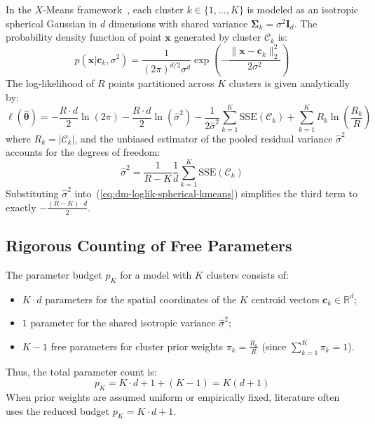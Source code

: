 In the $X$-Means framework~\cite{pelleg2000}, each cluster $k \in \{1, \dots, K\}$ is modeled as an isotropic spherical Gaussian in $d$ dimensions with shared variance $\boldsymbol{\Sigma}_k = \sigma^2 \mathbf{I}_d$. The probability density function of point $\mathbf{x}$ generated by cluster $\mathcal{C}_k$ is:
\begin{equation}
\label{eq:dm-spherical-gaussian-pdf}
p(\mathbf{x} | \mathbf{c}_k, \sigma^2) = \frac{1}{(2\pi)^{d/2} \sigma^d} \exp\left( -\frac{\|\mathbf{x} - \mathbf{c}_k\|_2^2}{2\sigma^2} \right)
\end{equation}
The log-likelihood of $R$ points partitioned across $K$ clusters is given analytically by:
\begin{equation}
\label{eq:dm-loglik-spherical-kmeans}
\ell(\hat{\boldsymbol{\theta}}) = -\frac{R \cdot d}{2} \ln(2\pi) - \frac{R \cdot d}{2} \ln(\hat{\sigma}^2) - \frac{1}{2\hat{\sigma}^2} \sum_{k=1}^K \mathrm{SSE}(\mathcal{C}_k) + \sum_{k=1}^K R_k \ln\left(\frac{R_k}{R}\right)
\end{equation}
where $R_k = |\mathcal{C}_k|$, and the unbiased estimator of the pooled residual variance $\hat{\sigma}^2$ accounts for the degrees of freedom:
\begin{equation}
\label{eq:dm-sigma-sq-unbiased}
\hat{\sigma}^2 = \frac{1}{R - K} \frac{1}{d} \sum_{k=1}^K \mathrm{SSE}(\mathcal{C}_k)
\end{equation}
Substituting $\hat{\sigma}^2$ into~(\ref{eq:dm-loglik-spherical-kmeans}) simplifies the third term to exactly $-\frac{(R - K) \cdot d}{2}$.

\subsection{Rigorous Counting of Free Parameters}

The parameter budget $p_K$ for a model with $K$ clusters consists of:
\begin{itemize}
    \item $K \cdot d$ parameters for the spatial coordinates of the $K$ centroid vectors $\mathbf{c}_k \in \mathbb{R}^d$;
    \item $1$ parameter for the shared isotropic variance $\hat{\sigma}^2$;
    \item $K - 1$ free parameters for cluster prior weights $\pi_k = \frac{R_k}{R}$ (since $\sum_{k=1}^K \pi_k = 1$).
\end{itemize}
Thus, the total parameter count is:
\begin{equation}
\label{eq:dm-pk-spherical-count}
p_K = K \cdot d + 1 + (K - 1) = K(d + 1)
\end{equation}
When prior weights are assumed uniform or empirically fixed, literature often uses the reduced budget $p_K = K \cdot d + 1$.

